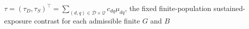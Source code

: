 \(\tau=(\tau_D,\tau_S)^\top=\sum_{(d,q)\in\mathcal D\times\mathcal Q}c_{dq}\mu_{dq}\), the fixed finite-population sustained-exposure contrast for each admissible finite \(G\) and \(B\)